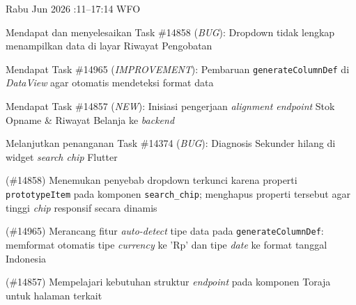 \begin{logtable}
    {
        Rabu  Jun 2026 :11--17:14 \linebreak %
        WFO
    }{
        \begin{loglist}
            \item Mendapat dan menyelesaikan Task \#14858 (\textit{BUG}): Dropdown tidak lengkap
            menampilkan data di layar Riwayat Pengobatan
            \item Mendapat Task \#14965 (\textit{IMPROVEMENT}): Pembaruan
            \texttt{generateColumnDef} di \textit{DataView} agar otomatis mendeteksi format
            data
            \item Mendapat Task \#14857 (\textit{NEW}): Inisiasi pengerjaan \textit{alignment
                endpoint} Stok Opname \& Riwayat Belanja ke \textit{backend}
            \item Melanjutkan penanganan Task \#14374 (\textit{BUG}): Diagnosis Sekunder hilang
            di widget \textit{search chip} Flutter
        \end{loglist}
    }{
        \begin{logwork}
            \item (\#14858) Menemukan penyebab dropdown terkunci karena properti \texttt{prototypeItem} pada komponen \texttt{search\_chip}; menghapus properti tersebut agar tinggi \textit{chip} responsif secara dinamis
            \item (\#14965) Merancang fitur \textit{auto-detect} tipe data pada \texttt{generateColumnDef}: memformat otomatis tipe \textit{currency} ke 'Rp' dan tipe \textit{date} ke format tanggal Indonesia
            \item (\#14857) Mempelajari kebutuhan struktur \textit{endpoint} pada komponen Toraja untuk halaman terkait
        \end{logwork}
    }


\end{logtable}
